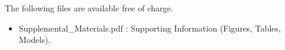 \documentclass[journal=esthag,manuscript=article]{achemso}
\begin{document}

\begin{suppinfo}
The following files are available free of charge.
\begin{itemize}
  \item Supplemental\_Materials.pdf : Supporting Information (Figures, Tables, Models).
\end{itemize}
\end{suppinfo}



\end{document}
